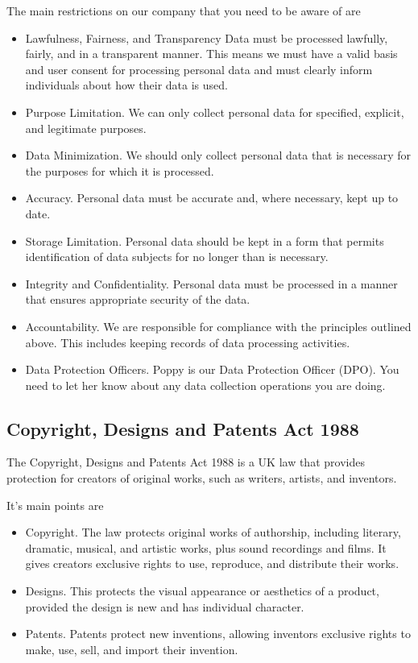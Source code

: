 \documentclass{article}
\begin{document}
The main restrictions on our company that you need to be aware of are
\begin{itemize}
    \item Lawfulness, Fairness, and Transparency Data must be processed lawfully, fairly, and in a transparent manner. This means we must have a valid basis and user consent for processing personal data and must clearly inform individuals about how their data is used.    
    \item Purpose Limitation. We can only collect personal data for specified, explicit, and legitimate purposes.
    \item Data Minimization. We should only collect personal data that is necessary for the purposes for which it is processed.
    \item Accuracy. Personal data must be accurate and, where necessary, kept up to date.
    \item Storage Limitation. Personal data should be kept in a form that permits identification of data subjects for no longer than is necessary.
    \item Integrity and Confidentiality. Personal data must be processed in a manner that ensures appropriate security of the data.
    \item Accountability. We are responsible for compliance with the principles outlined above. This includes keeping records of data processing activities.
    \item Data Protection Officers. Poppy is our Data Protection Officer (DPO). You need to let her know about any data collection operations you are doing.
\end{itemize}

\subsection{Copyright, Designs and Patents Act 1988}
The Copyright, Designs and Patents Act 1988 is a UK law that provides protection for creators of original works, such as writers, artists, and inventors.

It's main points are
\begin{itemize}
    \item Copyright. The law protects original works of authorship, including literary, dramatic, musical, and artistic works, plus sound recordings and films. It gives creators exclusive rights to use, reproduce, and distribute their works. 
    \item Designs. This protects the visual appearance or aesthetics of a product, provided the design is new and has individual character.
    \item Patents. Patents protect new inventions, allowing inventors exclusive rights to make, use, sell, and import their invention. 

\end{itemize}
\end{document}
